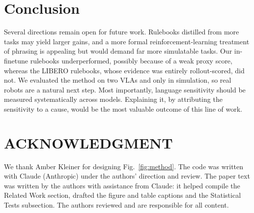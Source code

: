 \documentclass[letterpaper, 10 pt, conference]{ieeeconf} %
\newif\ifanon
\begin{document}
\section{Conclusion}
\label{sec:conclusion}

Several directions remain open for future work. Rulebooks distilled from more tasks may yield larger gains, and a more formal reinforcement-learning treatment of phrasing is appealing but would demand far more simulatable tasks. Our in-finetune rulebooks underperformed, possibly because of a weak proxy score, whereas the LIBERO rulebooks, whose evidence was entirely rollout-scored, did not.  We evaluated the method on two VLAs and only in simulation, so real robots are a natural next step. Most importantly, language sensitivity should be measured systematically across models. Explaining it, by attributing the sensitivity to a cause, would be the most valuable outcome of this line of work.

\section*{ACKNOWLEDGMENT}

\ifanon\else We thank Amber Kleiner for designing Fig.~\ref{fig:method}. \fi
The code was written with Claude (Anthropic) under the authors'
direction and review. The paper text was written by the authors with assistance from
Claude: it helped compile the Related Work section, drafted the figure
and table captions and the Statistical Tests subsection.
The authors
reviewed and are responsible for all content.

\balance


\end{document}
